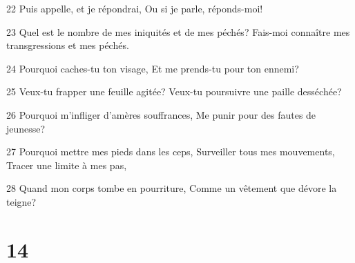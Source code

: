 \par 22 Puis appelle, et je répondrai, Ou si je parle, réponds-moi!
\par 23 Quel est le nombre de mes iniquités et de mes péchés? Fais-moi connaître mes transgressions et mes péchés.
\par 24 Pourquoi caches-tu ton visage, Et me prends-tu pour ton ennemi?
\par 25 Veux-tu frapper une feuille agitée? Veux-tu poursuivre une paille desséchée?
\par 26 Pourquoi m'infliger d'amères souffrances, Me punir pour des fautes de jeunesse?
\par 27 Pourquoi mettre mes pieds dans les ceps, Surveiller tous mes mouvements, Tracer une limite à mes pas,
\par 28 Quand mon corps tombe en pourriture, Comme un vêtement que dévore la teigne?

\chapter{14}

